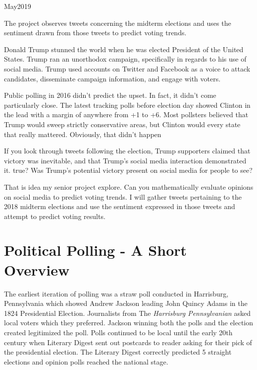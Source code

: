 \documentclass[11pt, twoside, reqno]{book}
\begin{document}
    {May}{2019}

\abstr

The project observes tweets concerning the midterm elections and uses the sentiment drawn from those tweets to predict voting trends.

\tableofcontents





\startmain

\intro
\hspace{0.1in}Donald Trump stunned the world when he was elected President of the United States. Trump ran an unorthodox campaign, specifically in regards to his use of social media. Trump used accounts on Twitter and Facebook as a voice to attack candidates, disseminate campaign information, and engage with voters. 

Public polling in 2016 didn’t predict the upset. In fact, it didn’t come particularly close. The latest tracking polls before election day showed Clinton in the lead with a margin of anywhere from +1 to +6. Most pollsters believed that Trump would sweep strictly conservative areas, but Clinton would every state that really mattered. Obviously, that didn’t happen

If you look through tweets following the election, Trump supporters claimed that victory was inevitable, and that Trump’s social media interaction demonstrated it. true? Was Trump’s potential victory present on social media for people to see? 

That is idea my senior project explore. Can you mathematically evaluate opinions on social media to predict voting trends. I will gather tweets pertaining to the 2018 midterm elections and use the sentiment expressed in those tweets and attempt to predict voting results. 


\section{Political Polling - A Short Overview}
\hspace{0.1in} The earliest iteration of polling was a straw poll conducted in Harrisburg, Pennsylvania which showed Andrew Jackson leading John Quincy Adams in the 1824 Presidential Election. Journalists from The \textit{Harrisburg Pennsylvanian} asked local voters which they preferred. Jackson winning both the polls and the election created legitimized the poll. Polls continued to be local until the early 20th century when Literary Digest sent out postcards to reader asking for their pick of the presidential election. The Literary Digest correctly predicted 5 straight elections and opinion polls reached the national stage. 
\end{document}
